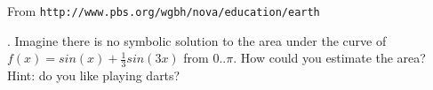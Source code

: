 \begin{marginfigure}[-1.8in]
\begin{center}
\caption{\tiny From  {\tt http://www.pbs.org/wgbh/nova/education/earth}}
\end{center}
\end{marginfigure}

\vspace{15mm}

.  Imagine there is no symbolic solution to the area under the curve of $f(x) = sin(x) + \frac{1}{3} sin(3x)$ from $0..\pi$. How could you estimate the area? Hint: do you like playing darts?

\begin{marginfigure}
\begin{center}
\end{center}
\end{marginfigure}
